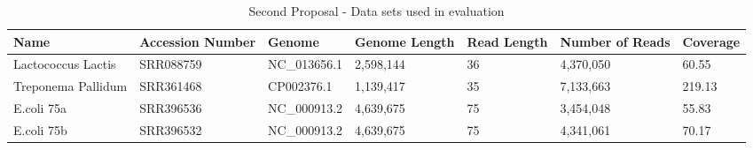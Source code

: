 \documentclass[12pt]{llncs}
\newcommand{\TBstrut}{{\rule{0pt}{7ex}}{\rule[2ex]{0pt}{0pt}}} %
\begin{document}
\begin{longtable}{|m{22mm}|m{21mm}|m{23mm}|m{16.5mm}|m{12mm}|m{17mm}|m{16mm}|}
	    \caption{\label{tab:eval-data}Second Proposal - Data sets used in evaluation} \\
        \hline
        Name & Accession Number & Genome & Genome Length & Read Length & Number of Reads & Coverage\TBstrut\\ %
        \hline
        Lactococcus Lactis & SRR088759 & NC\_013656.1 & 2,598,144 & 36 & 4,370,050 & 60.55\TBstrut\\ %
        \hline
        Treponema Pallidum & SRR361468 & CP002376.1 & 1,139,417 & 35 & 7,133,663 & 219.13\TBstrut\\ %
        \hline
        E.coli 75a & SRR396536 & NC\_000913.2 & 4,639,675 & 75 & 3,454,048 & 55.83\TBstrut\\ %
        \hline
        E.coli 75b & SRR396532 & NC\_000913.2 & 4,639,675 & 75 & 4,341,061 & 70.17\TBstrut\\ %
        \hline
\end{longtable}
\end{document}
